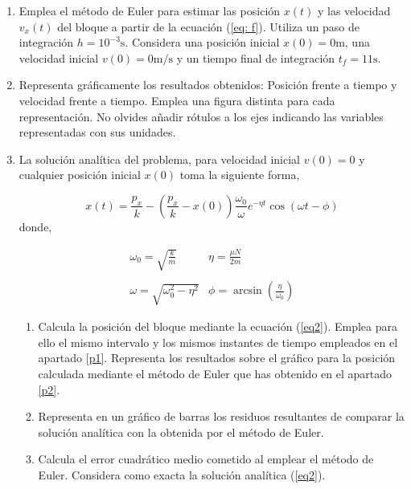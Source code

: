 \begin{enumerate}

	\item \label{p1} Emplea el método de Euler para estimar las posición $x(t)$ y las velocidad $v_x(t)$ del bloque a partir de la ecuación (\ref{eq: f}). Utiliza un paso de integración $h =10^{-3}\text{s}$. Considera una posición inicial $x(0) =0\text{m}$, una velocidad inicial $v(0) = 0\text{m/s}$ y un tiempo final de integración $t_{f}=11\text{s}$.

\item \label{p2} Representa gráficamente los resultados obtenidos: Posición frente a tiempo y velocidad frente a tiempo. Emplea una figura distinta para cada representación. No olvides añadir rótulos a los ejes indicando las variables representadas con sus unidades.

\item La solución analítica del problema, para velocidad inicial $v(0)=0$ y cualquier posición inicial $x(0)$ toma la siguiente forma,

%

\begin{equation}\label{eq2}
	x(t) = \frac{p_x}{k}-\left(\frac{p_x}{k}-x(0)\right)\frac{\omega_0}{\omega}e^{-\eta t}\cos\left(\omega t-\phi \right)
\end{equation}
donde,

\begin{equation}
\begin{matrix}
\omega_0 = \sqrt{\frac{k}{m}} & \eta = \frac{\mu N}{2m}\\
\ & \ \\
\omega = \sqrt{\omega_0^2 -\eta^2} &
\phi = \arcsin \left(\frac{\eta}{\omega_0}\right)
\end{matrix} \nonumber
\end{equation}
 
\begin{enumerate}
\item Calcula la posición del bloque mediante la ecuación (\ref{eq2}). Emplea para ello el mismo intervalo y los mismos instantes de tiempo empleados en el apartado \ref{p1}. Representa los resultados sobre el gráfico  para la posición calculada mediante el método de Euler que has obtenido en el apartado \ref{p2}. 
\item Representa en un gráfico de barras los residuos resultantes de comparar la solución analítica con la obtenida por el método de Euler.
\item Calcula el error cuadrático medio cometido al emplear el método de Euler. Considera como exacta la solución analítica (\ref{eq2}).
\end{enumerate}


\end{enumerate}
